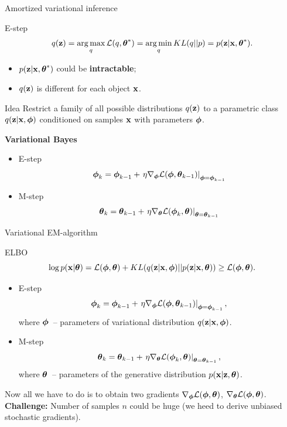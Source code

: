 \begin{frame}{Amortized variational inference}
    \begin{block}{E-step}
    \vspace{-0.3cm}
    \[
		q(\mathbf{z}) = \operatorname*{arg\,max}_q \mathcal{L} (q, \boldsymbol{\theta}^*) = \operatorname*{arg\,min}_q KL(q || p) =
		 p(\mathbf{z}| \mathbf{x}, \boldsymbol{\theta}^*).
	\]
	\begin{itemize}
		\item $p(\mathbf{z}| \mathbf{x}, \boldsymbol{\theta}^*)$ could be \textbf{intractable};
		\item $q(\mathbf{z})$ is different for each object $\mathbf{x}$.
	\end{itemize}
    \end{block}
	\begin{block}{Idea}
	Restrict a family of all possible distributions $q(\mathbf{z})$ to a parametric class $q(\mathbf{z}|\mathbf{x}, \boldsymbol{\phi})$ conditioned on samples $\mathbf{x}$ with parameters $\boldsymbol{\phi}$.
	\end{block}
	
	\textbf{Variational Bayes}
	\begin{itemize}
		\item E-step
		\[
		\boldsymbol{\phi}_k = \boldsymbol{\phi}_{k-1} + \left.\eta \nabla_{\boldsymbol{\phi}} \mathcal{L}(\boldsymbol{\phi}, \boldsymbol{\theta}_{k-1})\right|_{\boldsymbol{\phi}=\boldsymbol{\phi}_{k-1}}
		\]
		\item M-step
		\[
		\boldsymbol{\theta}_k = \boldsymbol{\theta}_{k-1} + \left.\eta \nabla_{\boldsymbol{\theta}} \mathcal{L}(\boldsymbol{\phi}_k, \boldsymbol{\theta})\right|_{\boldsymbol{\theta}=\boldsymbol{\theta}_{k-1}}
		\]
	\end{itemize}
\end{frame}
\begin{frame}{Variational EM-algorithm}
	\begin{block}{ELBO}
		\vspace{-0.5cm}
		\[
			\log p(\mathbf{x}| \boldsymbol{\theta}) = \mathcal{L} (\boldsymbol{\phi}, \boldsymbol{\theta}) + KL(q(\mathbf{z} | \mathbf{x}, \boldsymbol{\phi}) || p(\mathbf{z}|\mathbf{x}, \boldsymbol{\theta})) \geq \mathcal{L} (\boldsymbol{\phi}, \boldsymbol{\theta}).
		\]
		\vspace{-0.5cm}
	\end{block}
	\begin{itemize}
		\item E-step
		\[
		\boldsymbol{\phi}_k = \boldsymbol{\phi}_{k-1} + \left.\eta \nabla_{\boldsymbol{\phi}} \mathcal{L}(\boldsymbol{\phi}, \boldsymbol{\theta}_{k-1})\right|_{\boldsymbol{\phi}=\boldsymbol{\phi}_{k-1}},
		\]
		where $\boldsymbol{\phi}$~-- parameters of variational distribution $q(\mathbf{z} | \mathbf{x}, \boldsymbol{\phi})$.
		\item M-step
		\[
		\boldsymbol{\theta}_k = \boldsymbol{\theta}_{k-1} + \left.\eta \nabla_{\boldsymbol{\theta}} \mathcal{L}(\boldsymbol{\phi}_k, \boldsymbol{\theta})\right|_{\boldsymbol{\theta}=\boldsymbol{\theta}_{k-1}},
		\]
		where $\boldsymbol{\theta}$~-- parameters of the generative distribution $p(\mathbf{x} | \mathbf{z}, \boldsymbol{\theta})$.
	\end{itemize}
	Now all we have to do is to obtain two gradients $\nabla_{\boldsymbol{\phi}} \mathcal{L}(\boldsymbol{\phi}, \boldsymbol{\theta})$, $\nabla_{\boldsymbol{\theta}} \mathcal{L}(\boldsymbol{\phi}, \boldsymbol{\theta})$.  \\
	\textbf{Challenge:} Number of samples $n$ could be huge (we heed to derive unbiased stochastic gradients).
\end{frame}
